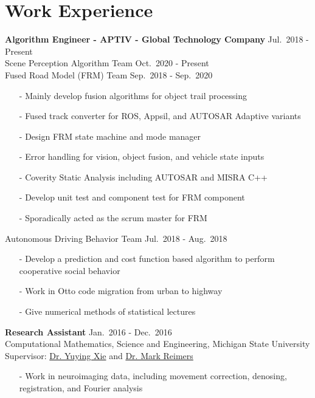 \documentclass[a4paper,10pt,dvipdfmx]{article}
\begin{document}
\section*{Work Experience}
\indent \textbf{Algorithm Engineer - APTIV - Global Technology Company} \hfill Jul.~2018 - Present\\
\indent Scene Perception Algorithm Team \hfill Oct.~2020 - Present\\
\indent Fused Road Model (FRM) Team \hfill Sep.~2018 - Sep.~2020
\begin{itemize}[noitemsep,nolistsep,leftmargin=12mm]
  \item[-] Mainly develop fusion algorithms for object trail processing
  \item[-] Fused track converter for ROS, Appsil, and AUTOSAR Adaptive variants
  \item[-] Design FRM state machine and mode manager
  \item[-] Error handling for vision, object fusion, and vehicle state inputs
  \item[-] Coverity Static Analysis including AUTOSAR and MISRA C++
  \item[-] Develop unit test and component test for FRM component
  \item[-] Sporadically acted as the scrum master for FRM
\end{itemize}

\indent Autonomous Driving Behavior Team \hfill Jul.~2018 - Aug.~2018
\begin{itemize}[noitemsep,nolistsep,leftmargin=12mm]
  \item[-] Develop a prediction and cost function based algorithm to perform cooperative social behavior
  \item[-] Work in Otto code migration from urban to highway
  \item[-] Give numerical methods of statistical lectures\\
\end{itemize}

\indent \textbf{Research Assistant} \hfill Jan.~2016 - Dec.~2016\\
\indent Computational Mathematics, Science and Engineering, Michigan State University\\
\indent Supervisor: \href{https://cmse.msu.edu/directory/faculty/yuying-xie/}{Dr. Yuying Xie} and \href{https://msu.edu/~reimersm/}{Dr. Mark Reimers}
\begin{itemize}[noitemsep,nolistsep,leftmargin=12mm]
  \item[-] Work in neuroimaging data, including movement correction, denosing, registration, and Fourier analysis\\
\end{itemize}
\end{document}
